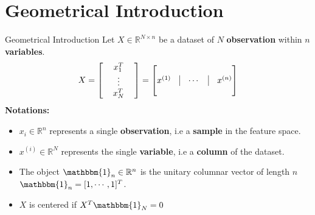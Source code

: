 \documentclass[10pt]{beamer}
\theoremstyle{definition}
\newcommand{\R}{\mathbb{R}}
\newcommand{\1}{\mathbbm{1}}
\begin{document}
\section{Geometrical Introduction}
\begin{frame}{Geometrical Introduction}
  Let $X \in \R^{N\times n}$ be a dataset of $N$
  {\bf observation} within $n$ {\bf variables}. 
  \begin{equation}
    X =
    \begin{bmatrix}
      \, & x_1 ^ T &\,\\
      \, & \vdots &\,\\
      \, & x_N ^ T &\,\\
    \end{bmatrix}
    =
    \begin{bmatrix}
      & & & \\
      x^{(1)} &\vline& \cdots& \vline& x^{(n)}\\
      & & & \\
    \end{bmatrix}
    \label{Geometrical view}
  \end{equation}
  {\bf Notations:}
  \begin{itemize}
    \item $x_i\in\R^n$ represents a single {\bf observation}, i.e a {\bf
      sample} in the feature space.
    \item $x^{(i)}\in\R^N$ represents the single {\bf variable}, i.e a {\bf
      column} of the dataset.
    \item The object $\1_n\in\R^n$ is the unitary columnar vector of length
      $n$ $\1_n=[1,\cdots,1]^T$.
    \item $X$ is centered if $X^T\1_N=0$
  \end{itemize}
\end{frame}
\end{document}

